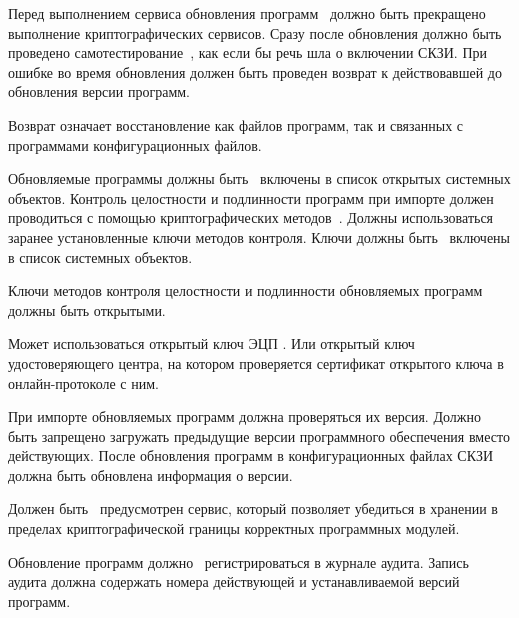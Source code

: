 \label{R.SU.Logic}
Перед выполнением сервиса обновления программ~ 
должно быть прекращено выполнение криптографических сервисов. 
%
Сразу после обновления должно быть проведено 
самотестирование~, 
как если бы речь шла о включении СКЗИ.
%
При ошибке во время обновления должен быть проведен
возврат к действовавшей до обновления версии программ. 

\begin{note}
Возврат означает восстановление как файлов программ, так и связанных с программами 
конфигурационных файлов. 
\end{note}

\label{R.SU.Import}
Обновляемые программы должны быть~ включены в список 
открытых системных объектов. Контроль целостности и подлинности программ
при импорте должен проводиться с помощью криптографических 
методов~. Должны использоваться заранее 
установленные ключи методов контроля. Ключи должны быть~ 
включены в список системных объектов.  

\label{R.SU.Sig}
Ключи методов контроля целостности и подлинности обновляемых программ должны 
быть открытыми. 

\begin{note}
Может использоваться открытый ключ ЭЦП . Или открытый 
ключ удостоверяющего центра, на котором проверяется сертификат открытого ключа 
 в онлайн-протоколе с ним. 
\end{note}

\label{R.SU.Version}
При импорте обновляемых программ должна проверяться их версия.
Должно быть запрещено загружать предыдущие версии программного обеспечения 
вместо действующих. После обновления программ в конфигурационных файлах СКЗИ
должна быть обновлена информация о версии.

\label{R.SU.PoS}
Должен быть~ предусмотрен сервис, 
который позволяет убедиться в хранении в пределах криптографической границы
корректных программных модулей.

\label{R.SU.AU}
Обновление программ должно~ регистрироваться в 
журнале аудита. 
%
Запись аудита должна содержать номера действующей и устанавливаемой версий 
программ.

